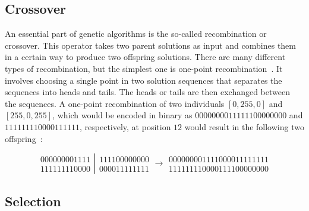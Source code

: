 \documentclass[paper=a4,%
  twoside,%
  BCOR4mm,%
  abstract=true,%
  toc=bibliography,%
  chapterprefix=true,%
  toc=bibliographynumbered,%
  open=right,%
  english,%
  pagesize=pdftex]{scrreprt}
\begin{document}
\subsection{Crossover}
\label{sec:background-crossover}
An essential part of genetic algorithms is the so-called recombination or crossover. This operator takes two parent solutions as input and combines them in a certain way to produce two offspring solutions. There are many different types of recombination, but the simplest one is one-point recombination~\cite{McMinn_2004}. It involves choosing a single point in two solution sequences that separates the sequences into heads and tails. The heads or tails are then exchanged between the  sequences. A one-point recombination of two individuals $[0, 255, 0]$ and $[255, 0, 255]$, which would be encoded in binary as $0000000011111100000000$ and $111111110000111111$, respectively, at position $12$ would result in the following two offspring~\cite{McMinn_2004}:

\[
\left.\begin{array}{c}
000000001111 \\  %
111111110000 %
\end{array}\right|
\begin{array}{c}
111100000000 \\  %
000011111111 %
\end{array} \longrightarrow
\begin{array}{c}
000000001111000011111111 \\  %
111111110000111100000000 %
\end{array}
\]


\subsection{Selection}
\end{document}
